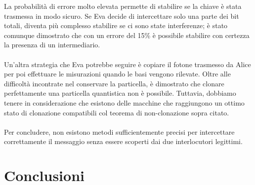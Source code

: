 \documentclass[italian,A4,12pt]{article}
\begin{document}
    La probabilità di errore molto elevata permette di stabilire se la chiave è stata trasmessa in modo sicuro.
    Se Eva decide di intercettare solo una parte dei bit totali, diventa più complesso stabilire se ci sono state interferenze; è stato comunque dimostrato che con un errore del 15\% è possibile stabilire con certezza la presenza di un intermediario.\\\\
    Un'altra strategia che Eva potrebbe seguire è copiare il fotone trasmesso da Alice per poi effettuare le misurazioni quando le basi vengono rilevate. Oltre alle difficoltà incontrate nel conservare la particella, è dimostrato che clonare perfettamente una particella quantistica non è possibile.
    Tuttavia, dobbiamo tenere in considerazione che esistono delle macchine che raggiungono un ottimo stato di clonazione compatibili col teorema di non-clonazione sopra citato.\\\\
     Per concludere, non esistono metodi sufficientemente precisi per intercettare correttamente il messaggio senza essere scoperti dai due interlocutori legittimi.
     \section{Conclusioni}
\end{document}

